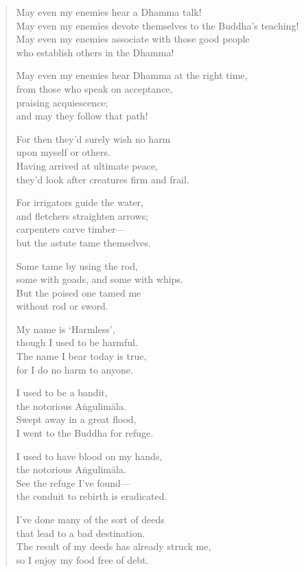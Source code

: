 \documentclass[12pt,openany]{book}%
\begin{document}
\begin{verse}
May even my enemies hear a Dhamma talk! \\
May even my enemies devote themselves to the Buddha’s teaching! \\
May even my enemies associate with those good people \\
who establish others in the Dhamma! 

May even my enemies hear Dhamma at the right time, \\
from those who speak on acceptance, \\
praising acquiescence; \\
and may they follow that path! 

For then they’d surely wish no harm \\
upon myself or others. \\
Having arrived at ultimate peace, \\
they’d look after creatures firm and frail. 

For irrigators guide the water, \\
and fletchers straighten arrows; \\
carpenters carve timber—\\
but the astute tame themselves. 

Some tame by using the rod, \\
some with goads, and some with whips. \\
But the poised one tamed me \\
without rod or sword. 

My name is ‘Harmless’, \\
though I used to be harmful. \\
The name I bear today is true, \\
for I do no harm to anyone. 

I used to be a bandit, \\
the notorious \textsanskrit{Aṅgulimāla}. \\
Swept away in a great flood, \\
I went to the Buddha for refuge. 

I used to have blood on my hands, \\
the notorious \textsanskrit{Aṅgulimāla}. \\
See the refuge I’ve found—\\
the conduit to rebirth is eradicated. 

I’ve done many of the sort of deeds \\
that lead to a bad destination. \\
The result of my deeds has already struck me, \\
so I enjoy my food free of debt. 


\end{verse}
\end{document}
